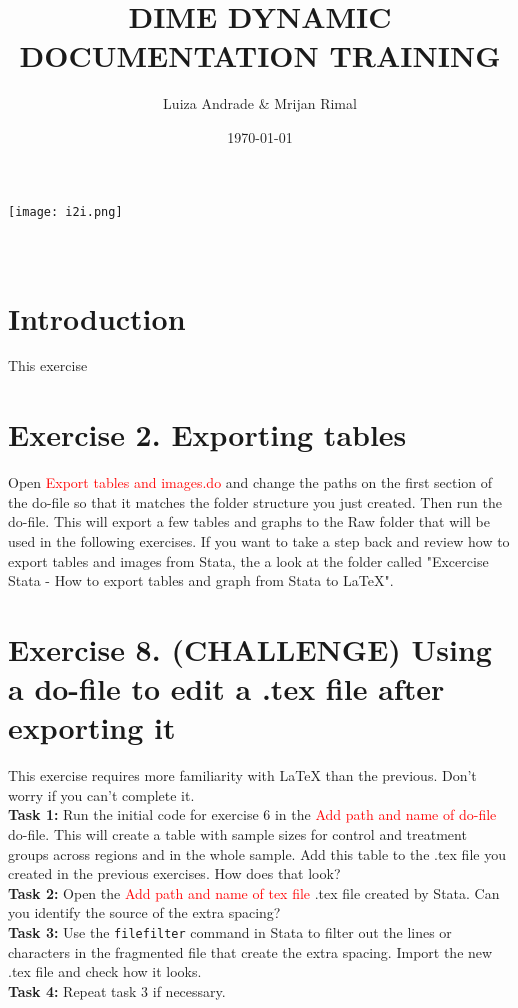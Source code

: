 \documentclass[12pts]{report}
\title{DIME DYNAMIC DOCUMENTATION TRAINING }
\author{Luiza Andrade \& Mrijan Rimal}
\date{\today}
\begin{document}
	
	
	\makeatletter
	\begin{titlepage}
		\begin{center}
			\texttt{[image: i2i.png]}\\[10ex]
			{\LARGE \bfseries  \@title }\\[2ex] 
			{\Large  \@author}\\[20ex] 
			{\large \@date}
		\end{center}
	\end{titlepage}
	\makeatother
	
	\section*{Introduction}
	This exercise

\section*{Exercise 2. Exporting tables}
Open \textcolor{red}{Export tables and images.do} and change the paths on the first section of the do-file so that it matches the folder structure you just created. Then run the do-file. This will export a few tables and graphs to the Raw folder that will be used in the following exercises. If you want to take a step back and review how to export tables and images from Stata, the a look at the folder called "Excercise Stata - How to export tables and graph from Stata to LaTeX".

\section*{Exercise 8. (CHALLENGE) Using a do-file to edit a .tex file after exporting it}

This exercise requires more familiarity with {\LaTeX} than the previous. Don't worry if you can't complete it. \\

\textbf{Task 1:} Run the initial code for exercise 6 in the \textcolor{red}{Add path and name of do-file} do-file. This will create a table with sample sizes for control and treatment groups across regions and in the whole sample. Add this table to the .tex file you created in the previous exercises. How does that look?\\

\textbf{Task 2:} Open the \textcolor{red}{Add path and name of tex file} .tex file created by Stata. Can you identify the source of the extra spacing?\\

\textbf{Task 3:} Use the \texttt{filefilter} command in Stata to filter out the lines or characters in the fragmented file that create the extra spacing. Import the new .tex file and check how it looks.\\

\textbf{Task 4:} Repeat task 3 if necessary.
\end{document}
